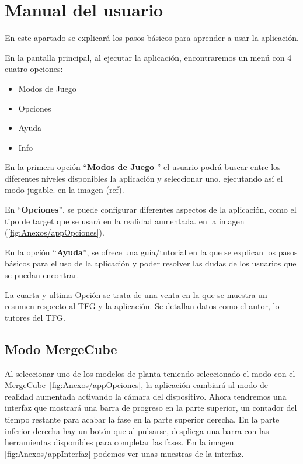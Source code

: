 \section{Manual del usuario}

En este apartado se explicará los pasos básicos para aprender a usar la aplicación.

En la pantalla principal, al ejecutar la aplicación, encontraremos un menú con 4 cuatro opciones: 
\begin{itemize}
	\item Modos de Juego
	\item Opciones
	\item Ayuda
	\item Info
\end{itemize}


En la primera opción ``\textbf{Modos de Juego} '' el usuario podrá buscar entre los diferentes niveles disponibles la aplicación y seleccionar uno, ejecutando así el modo jugable. en la imagen (ref).

En ``\textbf{Opciones}'', se puede configurar diferentes aspectos de la aplicación, como el tipo de target que se usará en la realidad aumentada. en la imagen (\ref{fig:Anexos/appOpciones}).


En la opción ``\textbf{Ayuda}'', se ofrece una guía/tutorial en la que se explican los pasos básicos para el uso de la aplicación y poder resolver las dudas de los usuarios que se puedan encontrar.

La cuarta y ultima Opción se trata de una venta en la que se muestra un resumen respecto al TFG y la aplicación. Se detallan datos como el autor, lo tutores del TFG. 


\subsection{Modo MergeCube }

Al seleccionar uno de los modelos de planta teniendo seleccionado el modo con el MergeCube~\ref{fig:Anexos/appOpciones}, la aplicación cambiará al modo de realidad aumentada activando la cámara del dispositivo. Ahora tendremos una interfaz que mostrará una barra de progreso en la parte superior, un contador del tiempo restante para acabar la fase en la parte superior derecha. En la parte inferior derecha hay un botón que al pulsarse, despliega una barra con las herramientas disponibles para completar las fases. En la imagen \ref{fig:Anexos/appInterfaz} podemos ver unas muestras de la interfaz.

